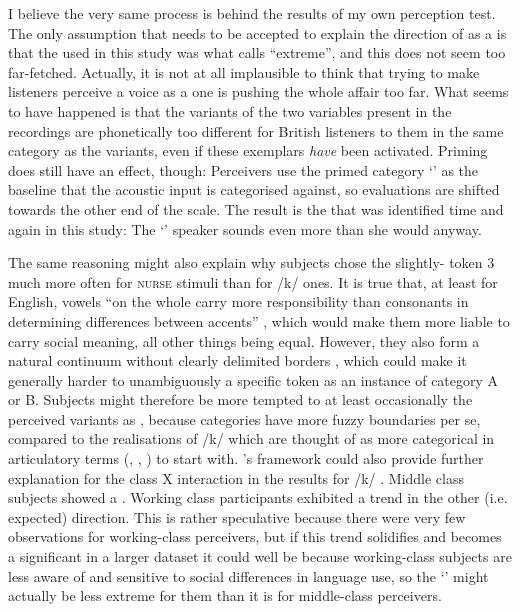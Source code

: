 I believe the very same process is behind the results of my own perception test.
The only assumption that needs to be accepted to explain the direction of  as a  is that the  used in this study was what \citeauthor{herr1986} calls ``extreme'', and this does not seem too far-fetched.
Actually, it is not at all implausible to think that trying to make listeners perceive a  voice as a  one is pushing the whole affair too far.
What seems to have happened is that the  variants of the two  variables present in the recordings are phonetically too different for British listeners to  them in the same category as the  variants, even if these exemplars \emph{have} been activated.
Priming does still have an effect, though: Perceivers use the primed category `' as the baseline that the acoustic input is categorised against, so evaluations are shifted towards the other end of the scale.
The result is the  that was identified time and again in this study: The `' speaker sounds even more  than she would anyway.

The same reasoning might also explain why subjects chose the slightly- token 3 much more often for \textsc{nurse} stimuli than for /k/ ones.
It is true that, at least for English, vowels ``on the whole carry more responsibility than consonants in determining differences between accents'' \parencite[12]{foulkesdocherty1999a}, which would make them more liable to carry social meaning, all other things being equal.
However, they also form a natural continuum without clearly delimited borders \parencite[cf.][12]{foulkesdocherty1999a}, which could make it generally harder to unambiguously  a specific token as an instance of category A or B.
Subjects might therefore be more tempted to at least occasionally  the perceived variants as , because  categories have more fuzzy boundaries per se, compared to the realisations of /k/ which are thought of as more categorical in articulatory terms (, , ) to start with.
\citeauthor{herr1986}'s framework could also provide further explanation for the class X  interaction in the results for /k/ .
Middle class subjects showed a .
Working class participants exhibited a trend in the other (i.e. expected) direction.
This is rather speculative because there were very few observations for working-class perceivers, but if this trend solidifies and becomes a significant  in a larger dataset it could well be because working-class subjects are less aware of and sensitive to social differences in language use, so the  `' might actually be less extreme for them than it is for middle-class perceivers.

